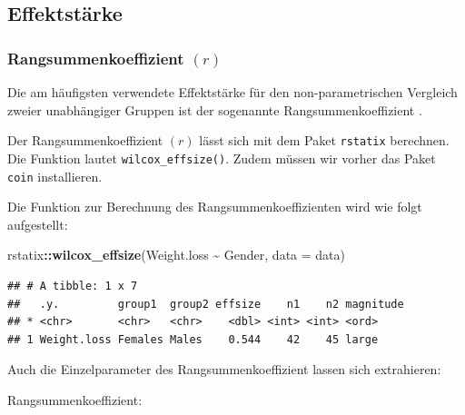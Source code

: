 \documentclass[
]{book}
\newenvironment{Shaded}{\begin{snugshade}}{\end{snugshade}}
\newcommand{\AttributeTok}[1]{\textcolor[rgb]{0.13,0.29,0.53}{#1}}
\newcommand{\FunctionTok}[1]{\textcolor[rgb]{0.13,0.29,0.53}{\textbf{#1}}}
\newcommand{\NormalTok}[1]{#1}
\newcommand{\SpecialCharTok}[1]{\textcolor[rgb]{0.81,0.36,0.00}{\textbf{#1}}}
\begin{document}
\subsection{Effektstärke}\label{effektstuxe4rke-3}

\subsubsection{\texorpdfstring{Rangsummenkoeffizient \((r)\)}{Rangsummenkoeffizient (r)}}\label{rangsummenkoeffizient-r}

Die am häufigsten verwendete Effektstärke für den non-parametrischen Vergleich zweier unabhängiger Gruppen ist der sogenannte Rangsummenkoeffizient \citep{tomczak2014need}.

Der Rangsummenkoeffizient \((r)\) lässt sich mit dem Paket \texttt{rstatix} berechnen. Die Funktion lautet \texttt{wilcox\_effsize()}. Zudem müssen wir vorher das Paket \texttt{coin} installieren.

Die Funktion zur Berechnung des Rangsummenkoeffizienten wird wie folgt aufgestellt:

\begin{Shaded}
\begin{Highlighting}[]
\NormalTok{rstatix}\SpecialCharTok{::}\FunctionTok{wilcox\_effsize}\NormalTok{(Weight.loss }\SpecialCharTok{\textasciitilde{}}\NormalTok{ Gender, }\AttributeTok{data =}\NormalTok{ data)}
\end{Highlighting}
\end{Shaded}

\begin{verbatim}
## # A tibble: 1 x 7
##   .y.         group1  group2 effsize    n1    n2 magnitude
## * <chr>       <chr>   <chr>    <dbl> <int> <int> <ord>    
## 1 Weight.loss Females Males    0.544    42    45 large
\end{verbatim}

Auch die Einzelparameter des Rangsummenkoeffizient lassen sich extrahieren:

Rangsummenkoeffizient:

\begin{Shaded}
\end{Shaded}
\end{document}
